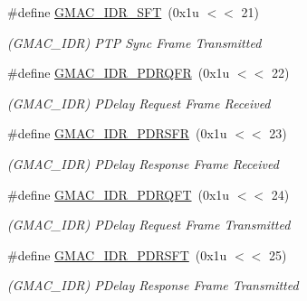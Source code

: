 \begin{DoxyCompactItemize}
\mbox{\label{group__SAMV71__GMAC_ga03cc6db018d0446a599c6de8dbc28d24}} 
\#define \mbox{\hyperlink{group__SAMV71__GMAC_ga03cc6db018d0446a599c6de8dbc28d24}{G\+M\+A\+C\+\_\+\+I\+D\+R\+\_\+\+S\+FT}}~(0x1u $<$$<$ 21)
\begin{DoxyCompactList}\small\item\em (G\+M\+A\+C\+\_\+\+I\+DR) P\+TP Sync Frame Transmitted \end{DoxyCompactList}\item 
\mbox{\label{group__SAMV71__GMAC_ga3c4b887a53ea76463c15db8cdcf9f31d}} 
\#define \mbox{\hyperlink{group__SAMV71__GMAC_ga3c4b887a53ea76463c15db8cdcf9f31d}{G\+M\+A\+C\+\_\+\+I\+D\+R\+\_\+\+P\+D\+R\+Q\+FR}}~(0x1u $<$$<$ 22)
\begin{DoxyCompactList}\small\item\em (G\+M\+A\+C\+\_\+\+I\+DR) P\+Delay Request Frame Received \end{DoxyCompactList}\item 
\mbox{\label{group__SAMV71__GMAC_gac25c76126576bd0064e3e6384fdaadda}} 
\#define \mbox{\hyperlink{group__SAMV71__GMAC_gac25c76126576bd0064e3e6384fdaadda}{G\+M\+A\+C\+\_\+\+I\+D\+R\+\_\+\+P\+D\+R\+S\+FR}}~(0x1u $<$$<$ 23)
\begin{DoxyCompactList}\small\item\em (G\+M\+A\+C\+\_\+\+I\+DR) P\+Delay Response Frame Received \end{DoxyCompactList}\item 
\mbox{\label{group__SAMV71__GMAC_gae3eccd1ed2607e943c55ed9655377742}} 
\#define \mbox{\hyperlink{group__SAMV71__GMAC_gae3eccd1ed2607e943c55ed9655377742}{G\+M\+A\+C\+\_\+\+I\+D\+R\+\_\+\+P\+D\+R\+Q\+FT}}~(0x1u $<$$<$ 24)
\begin{DoxyCompactList}\small\item\em (G\+M\+A\+C\+\_\+\+I\+DR) P\+Delay Request Frame Transmitted \end{DoxyCompactList}\item 
\mbox{\label{group__SAMV71__GMAC_ga1ba746fb0ed0a218e1130f9156d782e0}} 
\#define \mbox{\hyperlink{group__SAMV71__GMAC_ga1ba746fb0ed0a218e1130f9156d782e0}{G\+M\+A\+C\+\_\+\+I\+D\+R\+\_\+\+P\+D\+R\+S\+FT}}~(0x1u $<$$<$ 25)
\begin{DoxyCompactList}\small\item\em (G\+M\+A\+C\+\_\+\+I\+DR) P\+Delay Response Frame Transmitted \end{DoxyCompactList}\item 
$$
\end{DoxyCompactItemize}

